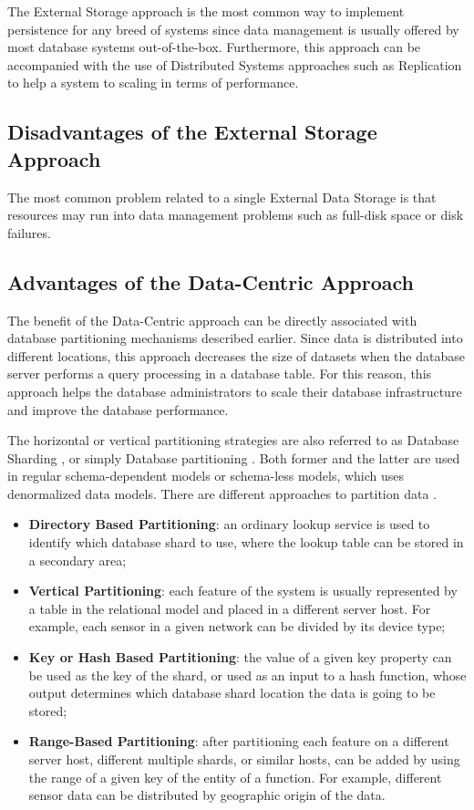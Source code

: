 The External Storage approach is the most common way to implement persistence
for any breed of systems since data management is usually offered by most
database systems out-of-the-box. Furthermore, this approach can be accompanied
with the use of Distributed Systems approaches such as Replication to help a
system to scaling in terms of performance.

\subsection{Disadvantages of the External Storage Approach}

The most common problem related to a single External Data Storage is that 
resources may run into data management problems such as full-disk space or
disk failures.

\subsection{Advantages of the Data-Centric Approach}

The benefit of the Data-Centric approach can be directly associated with
database partitioning mechanisms described earlier. Since data is distributed
into different locations, this approach decreases the size of datasets when the
database server performs a query processing in a database table. For this
reason, this approach helps the database administrators to scale their database
infrastructure and improve the database performance.

The horizontal or vertical partitioning strategies are also referred to as
Database Sharding \cite{db-shard-discussion}, or simply Database partitioning
\cite{db-table-partition, db-partitioning-relational}. Both former and the
latter are used in regular schema-dependent models or schema-less models,
which uses denormalized data models. There are different approaches to
partition data \cite{db-shard-schemas, db-partitioning-relational}.

\begin{itemize}
  \item \textbf{Directory Based Partitioning}: an ordinary lookup service is
  used to identify which database shard to use, where the lookup table can be
  stored in a secondary area;
  \item \textbf{Vertical Partitioning}: each feature of the system is usually
  represented by a table in the relational model and placed in a different
  server host. For example, each sensor in a given network can be divided by
  its device type;
  \item \textbf{Key or Hash Based Partitioning}: the value of a given key
  property can  be used as the key of the shard, or used as an input to a hash
  function, whose output determines which database shard location the data is
  going to  be stored;
  \item \textbf{Range-Based Partitioning}: after partitioning each feature on
  a different  server host, different multiple shards, or similar hosts, can be
  added by using  the range of a given key of the entity of a function. For
  example, different  sensor data can be distributed by geographic origin of
  the data.
\end{itemize}

